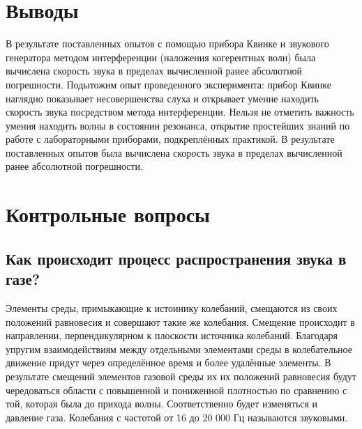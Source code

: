 \documentclass[otchet]{SCWorks}
\begin{document}
\section*{Выводы}
В результате поставленных опытов с помощью прибора Квинке и звукового генератора методом интерференции (наложения когерентных волн) была вычислена скорость звука в пределах вычисленной ранее абсолютной погрешности.
Подытожим опыт проведенного эксперимента: прибор Квинке наглядно показывает несовершенства слуха и открывает умение находить скорость звука посредством метода интерференции. Нельзя не отметить важность умения находить волны в состоянии резонанса, открытие простейших знаний по работе с лабораторными приборами, подкреплённых практикой. В результате поставленных опытов была вычислена скорость звука в пределах вычисленной ранее абсолютной погрешности.

\section{Контрольные вопросы}

\subsection{Как происходит процесс распространения звука в газе?}
Элементы среды, примыкающие к истоинику колебаний, смещаются из своих положений равновесия и совершают такие же колебания. Смещение происходит в направлении, перпендикулярном к плоскости источника колебаний. Благодаря упругим взаимодействиям между отдельными элементами среды в колебательное движение придут через определённое время и более удалённые элементы. В результате смещений элементов газовой среды их их положений равновесия будут чередоваться области с повышенной и пониженной плотностью по сравнению с той, которая была до прихода волны. Соответственно будет изменяться и давление газа. Колебания с частотой от 16 до 20 000 Гц называются звуковыми.
\end{document}
